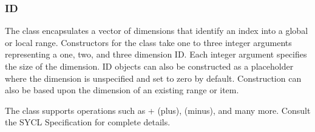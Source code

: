 \documentclass[letterpaper,10pt,english]{sphinxmanual}
\begin{document}
\subsubsection{ID}
\label{\detokenize{programming-interface/parallelism/id:id}}\label{\detokenize{programming-interface/parallelism/id:id1}}\label{\detokenize{programming-interface/parallelism/id::doc}}
The  class encapsulates a vector of dimensions that identify an
index into a global or local range. Constructors for the class take one
to three integer arguments representing a one, two, and three dimension
ID. Each integer argument specifies the size of the dimension. ID
objects can also be constructed as a placeholder where the dimension is
unspecified and set to zero by default. Construction can also be based
upon the dimension of an existing range or item.

The class supports operations such as + (plus), \sphinxhyphen{} (minus), and many
more. Consult the SYCL Specification for complete details.
\end{document}
